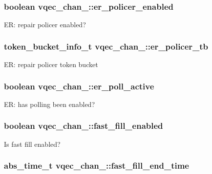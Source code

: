 \subsubsection{\setlength{\rightskip}{0pt plus 5cm}boolean \bf{vqec\_\-chan\_\-::er\_\-policer\_\-enabled}}\label{structvqec__chan___9fdc7937e9a69f6aec38a725d7c8442f}


ER: repair policer enabled? 
\subsubsection{\setlength{\rightskip}{0pt plus 5cm}token\_\-bucket\_\-info\_\-t \bf{vqec\_\-chan\_\-::er\_\-policer\_\-tb}}\label{structvqec__chan___1d3144e065b64a96f3a8dd7da74d5936}


ER: repair policer token bucket 
\subsubsection{\setlength{\rightskip}{0pt plus 5cm}boolean \bf{vqec\_\-chan\_\-::er\_\-poll\_\-active}}\label{structvqec__chan___863421ff1a3205b4295031c6763ae68d}


ER: has polling been enabled? 
\subsubsection{\setlength{\rightskip}{0pt plus 5cm}boolean \bf{vqec\_\-chan\_\-::fast\_\-fill\_\-enabled}}\label{structvqec__chan___206165f809840d9325c98e0c1bf5c8a0}


Is fast fill enabled? 
\subsubsection{\setlength{\rightskip}{0pt plus 5cm}abs\_\-time\_\-t \bf{vqec\_\-chan\_\-::fast\_\-fill\_\-end\_\-time}}\label{structvqec__chan___910d145ab18995d33a4473ee45394ee6}


